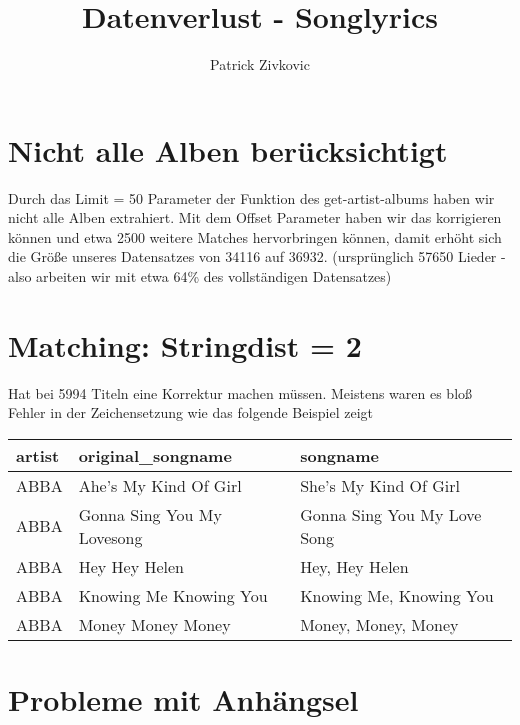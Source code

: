 \documentclass{article}\usepackage[]{graphicx}\usepackage[]{color}
\newenvironment{knitrout}{}{} %
\begin{document}
\vspace{-5cm}
\title{\vspace{-4cm}Datenverlust - Songlyrics}
\author{Patrick Zivkovic}

\maketitle

\section*{Nicht alle Alben berücksichtigt}

Durch das Limit = 50 Parameter der Funktion des get-artist-albums haben wir nicht alle Alben extrahiert. Mit dem Offset Parameter haben wir das korrigieren können und etwa 2500 weitere Matches hervorbringen können, damit erhöht sich die Größe unseres Datensatzes von 34116 auf 36932. (ursprünglich 57650 Lieder - also arbeiten wir mit etwa 64\% des vollständigen Datensatzes)

\section*{Matching: Stringdist = 2}



Hat bei 5994 Titeln eine Korrektur machen müssen. Meistens waren es bloß Fehler in der Zeichensetzung wie das folgende Beispiel zeigt \\

\begin{knitrout}
\color{fgcolor}
\begin{tabular}{l|l|l}
\hline
artist & original\_songname & songname\\
\hline
ABBA & Ahe's My Kind Of Girl & She's My Kind Of Girl\\
\hline
ABBA & Gonna Sing You My Lovesong & Gonna Sing You My Love Song\\
\hline
ABBA & Hey Hey Helen & Hey, Hey Helen\\
\hline
ABBA & Knowing Me Knowing You & Knowing Me, Knowing You\\
\hline
ABBA & Money Money Money & Money, Money, Money\\
\hline
\end{tabular}


\end{knitrout}

\section*{Probleme mit Anhängsel}
\end{document}
